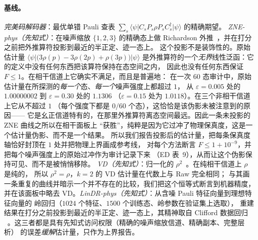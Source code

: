 \documentclass[11pt,a4paper]{article}
\newcommand{\ket}[1]{\lvert #1\rangle}
\newcommand{\bra}[1]{\langle #1\rvert}
\begin{document}
\paragraph{基线。}
\emph{完美码解码器}：最优单错 Pauli 查表
$\sum_s\bra{\psi}C_sP_s\rho P_sC_s^\dagger\ket{\psi}$ 的精确期望。
\emph{ZNE-phys（先知式）}：在噪声缩放 $\{1,2,3\}$ 的精确态上做 Richardson
外推~\cite{temme_zne,endo_zne}，并在打分之前把外推算符投影到最近的半正定、迹一态上。
这个投影不是装饰性的。原始估计量
$\bra{\psi}\big(3\rho(p)-3\rho(2p)+\rho(3p)\big)\ket{\psi}$
是外推算符的一个\emph{无界}线性泛函：它的定义中没有任何东西把该算符保持在态空间之内，
因此也没有任何东西保证 $F\le1$。在相干信道上它确实不满足，而且是普遍地：
在一次 $60$ 态审计中，原始估计量在所探测的\emph{每一个}态、\emph{每一个}噪声强度上都超过 $1$，
从 $\varepsilon=0.005$ 处的 $1.00000002$ 到 $\varepsilon=0.30$ 处的 $1.1306$
（$\varepsilon=0.15$ 处为 $1.0118$）。在三个非相干信道上它从不超过 $1$
（每个强度下都是 $0/60$ 个态），这恰恰是该伪影未被注意到的原因——
它是幺正信道特有的，在那里外推算符离态空间最远。因此一条未投影的 ZNE 曲线之所以在相干面板上
“获胜”，纯粹是因为它过冲了物理保真度，这是一个估计量伪影、而不是一个结果。
所以我们报告投影后的估计量，把每条保真度轴恰好封顶在 $1$ 处并把物理上界画成参考线，
对每个方法断言 $F\le1+10^{-9}$，并把每个噪声强度上的原始过冲作为审计记录下来
（ED 表~9），从而让这个伪影保持可见、而不是被悄悄移除。
\emph{VD（先知式）}：归一化的 $\rho^2$~\cite{huggins_vd}。在纯相干信道上 $\rho$ 是纯的，
所以 $\rho^2=\rho$，$k{=}2$ 的 VD 估计量在代数上与 Raw 完全相同；
与其画一条重复的曲线并暗示一个并不存在的比较，我们把这个恒等式断言到机器精度，
并在该面板中略去 VD。\emph{LinDR-phys（先知式）}：从含噪 Pauli 特征向量到理想特征向量的
岭回归（$1024$ 个特征、$1500$ 个训练态、岭参数在验证集上选取），
重建结果在打分之前投影到最近的半正定、迹一态上，其精神取自 Clifford 数据回归
~\cite{czarnik_cdr}。这三者都是具有先知式访问权限（精确的噪声缩放信道、精确副本、完整层析）
的误差\emph{缓解}估计量，只作为上界报告。
\end{document}
